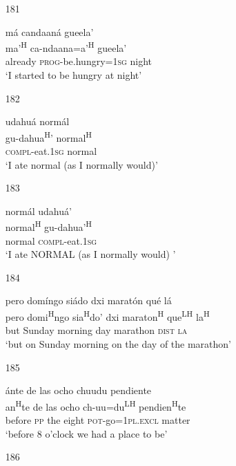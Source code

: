 \begin{itemize}
\item[181]
 
\glll m\'{a} candaan\'{a} gueela'\\
ma'\textsuperscript{H} ca-ndaana=a'\textsuperscript{H} gueela'\\
already \textsc{prog}-be.hungry=\textsc{1sg} night\\
\glt `I started to be hungry at night'



\item[182] 

\glll udahu\'{a} norm\'{a}l\\
 gu-dahua\textsuperscript{H}' normal\textsuperscript{H}\\
\textsc{compl}-eat.\textsc{1sg} normal \\
\glt `I ate normal (as I normally would)'


\item[183] 

\glll norm\'{a}l udahu\'{a}'\\
normal\textsuperscript{H} gu-dahua'\textsuperscript{H}\\
normal \textsc{compl}-eat.\textsc{1sg}\\
\glt `I ate NORMAL (as I normally would) '




\item[184]
 
\glll   pero dom\'{i}ngo si\'{a}do dxi marat\'{o}n qu\'{e} l\'{a} \\
pero domi\textsuperscript{H}ngo sia\textsuperscript{H}do' dxi maraton\textsuperscript{H} que\textsuperscript{LH} la\textsuperscript{H}\\
but Sunday morning day marathon \textsc{dist} \textsc{la}\\
\glt `but on Sunday morning on the day of the marathon'
 


\item[185]
 
\glll  \'{a}nte de las ocho chuudu pendiente\\
an\textsuperscript{H}te de las ocho ch-uu=du\textsuperscript{LH} pendien\textsuperscript{H}te\\
before \textsc{pp} the eight \textsc{pot}-go=\textsc{1pl.excl} matter\\
\glt `before 8 o'clock we had a place to be'
 


\item[186]


\end{itemize}
